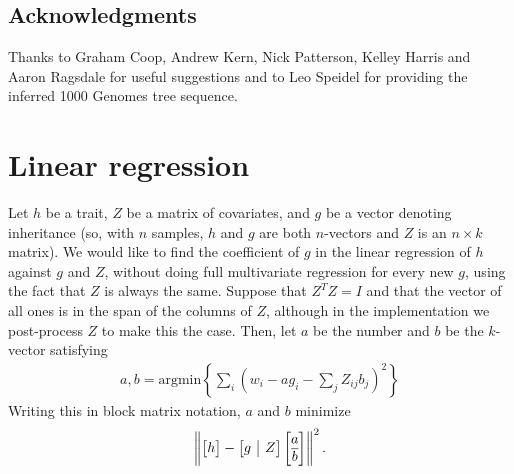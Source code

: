 \documentclass{article}
\begin{document}




\subsection*{Acknowledgments}
Thanks to Graham Coop, Andrew Kern, Nick Patterson, Kelley Harris and
Aaron Ragsdale for useful suggestions
and to Leo Speidel for providing the inferred 1000 Genomes tree sequence.




\clearpage
\appendix
\setcounter{table}{0}
\renewcommand{\thetable}{S\arabic{table}}
\setcounter{figure}{0}
\renewcommand{\thefigure}{S\arabic{figure}}




\appendix

\section{Linear regression}
\label{apx:regression}

Let $h$ be a trait, $Z$ be a matrix of covariates, and $g$ be a vector denoting inheritance
(so, with $n$ samples, $h$ and $g$ are both $n$-vectors and $Z$ is an $n \times k$ matrix).
We would like to find the coefficient of $g$ in the linear regression of $h$ against $g$ and $Z$,
without doing full multivariate regression for every new $g$,
using the fact that $Z$ is always the same.
Suppose that $Z^T Z = I$ and that the vector of all ones is in the span of the columns of $Z$,
although in the implementation we post-process $Z$ to make this the case.
Then, let $a$ be the number and $b$ be the $k$-vector satisfying
\begin{align*}
    a, b = \text{argmin}\left\{ \sum_i \left( w_i - a g_i - \sum_j Z_{ij} b_j \right)^2 \right\}
\end{align*}
Writing this in block matrix notation, $a$ and $b$ minimize
\begin{align*}
    \left\|
        \left[ \begin{array}{@{}c@{}} h \end{array}\right]
            -
        \left[ \begin{array}{@{}c|c@{}} g & Z \end{array} \right]
            \left[ \begin{array}{@{}c@{}} a \\ \hline b \end{array} \right]
    \right\|^2 .
\end{align*}
\end{document}
